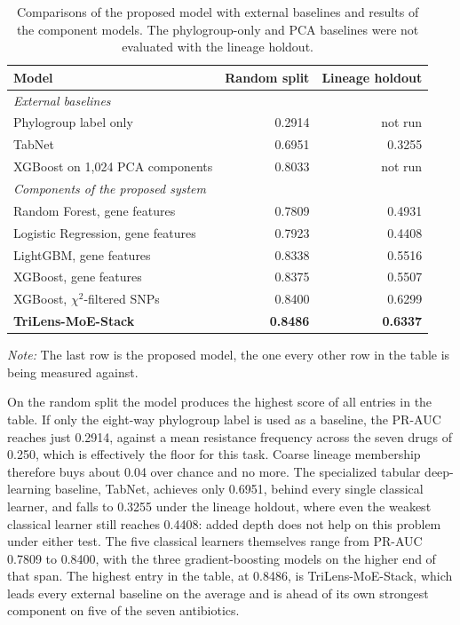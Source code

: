 \documentclass[journal]{IEEEtran}
\begin{document}
\begin{table}[!tb]
\caption{Comparisons of the proposed model with external baselines and results of the
component models. The phylogroup-only and PCA baselines were not evaluated with the
lineage holdout.}
\label{tab:baselines}
\centering
\footnotesize
\setlength{\tabcolsep}{3pt}
\renewcommand{\arraystretch}{1.05}
\begin{tabular}{|l|r|r|}
\hline
\rowcolor{headgrey}
\textbf{Model} & \textbf{Random split} & \textbf{Lineage holdout} \\ \hline
\multicolumn{3}{|l|}{\textit{External baselines}} \\ \hline
Phylogroup label only & 0.2914 & not run \\ \hline
TabNet & 0.6951 & 0.3255 \\ \hline
XGBoost on 1{,}024 PCA components & 0.8033 & not run \\ \hline
\multicolumn{3}{|l|}{\textit{Components of the proposed system}} \\ \hline
Random Forest, gene features & 0.7809 & 0.4931 \\ \hline
Logistic Regression, gene features & 0.7923 & 0.4408 \\ \hline
LightGBM, gene features & 0.8338 & 0.5516 \\ \hline
XGBoost, gene features & 0.8375 & 0.5507 \\ \hline
XGBoost, $\chi^2$-filtered SNPs & 0.8400 & 0.6299 \\ \hline
\rowcolor{oursblue}
\textbf{TriLens-MoE-Stack} & \textbf{0.8486} & \textbf{0.6337} \\ \hline
\end{tabular}
\renewcommand{\arraystretch}{1.0}
\vspace{0.4em}

\noindent\footnotesize\textit{Note:} The last row is the proposed model, the one every other row
in the table is being measured against.
\end{table}

On the random split the model produces the highest score of all entries in the table.
If only the eight-way phylogroup label is used as a baseline, the PR-AUC reaches just
0.2914, against a mean resistance frequency across the seven drugs of 0.250, which is
effectively the floor for this task. Coarse lineage membership therefore buys about
0.04 over chance and no more. The specialized tabular deep-learning
baseline, TabNet, achieves only 0.6951, behind every single classical learner, and
falls to 0.3255 under the lineage holdout, where even the weakest classical learner
still reaches 0.4408: added depth does not help on this problem under either test.
The five classical learners themselves range from PR-AUC 0.7809 to 0.8400, with the
three gradient-boosting models on the higher end of that span. The highest entry in
the table, at 0.8486, is TriLens-MoE-Stack, which leads every external baseline on the
average and is ahead of its own strongest component on five of the seven antibiotics.
\end{document}
